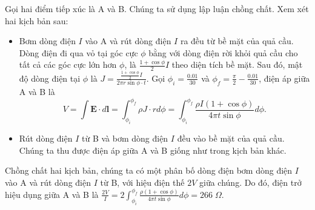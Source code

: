 


\begin{solution}

Gọi hai điểm tiếp xúc là A và B. Chúng ta sử dụng lập luận chồng chất. Xem xét hai kịch bản sau:
\begin{itemize}
    \item Bơm dòng điện $I$ vào A và rút dòng điện $I$ ra đều từ bề mặt của quả cầu. Dòng điện đi qua vỏ tại góc cực $\phi$ bằng với dòng điện rời khỏi quả cầu cho tất cả các góc cực lớn hơn $\phi$, là $\frac{1+\cos\phi}{2}I$ theo diện tích bề mặt. Sau đó, mật độ dòng điện tại $\phi$ là $J=\frac{\frac{1+\cos\phi}{2}I}{2\pi r\sin\phi\cdot t}$. Gọi $\phi_i=\frac{0.01}{30}$ và $\phi_f=\frac{\pi}{2}-\frac{0.01}{30}$, điện áp giữa A và B là $$V=\int \mathbf{E}\cdot d\mathbf{l}=\int_{\phi_i}^{\phi_f}\rho J\cdot rd\phi=\int_{\phi_i}^{\phi_f}\frac{\rho I(1+\cos\phi)}{4\pi t\sin\phi}d\phi.$$
    \item Rút dòng điện $I$ từ B và bơm dòng điện $I$ đều vào bề mặt của quả cầu. Chúng ta thu được điện áp giữa A và B giống như trong kịch bản khác.
\end{itemize}
Chồng chất hai kịch bản, chúng ta có một phân bố dòng điện bơm dòng điện $I$ vào A và rút dòng điện $I$ từ B, với hiệu điện thế $2V$ giữa chúng. Do đó, điện trở hiệu dụng giữa A và B là $\frac{2V}{I}=2\int_{\phi_i}^{\phi_f}\frac{\rho (1+\cos\phi)}{4\pi t\sin\phi}d\phi=\boxed{266\;\Omega}$.

\end{solution}
